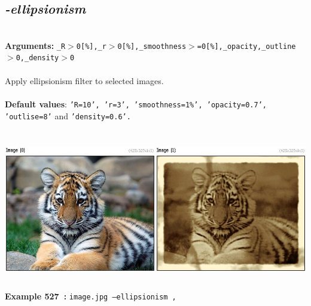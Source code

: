 \documentclass[a4paper,11pt,twoside]{book}
\begin{document}
\subsection{\emph{-ellipsionism} }\vspace*{-0.5em}
~\\\textbf{Arguments: } 
{\small \texttt{\_R$>$0[\%],\_r$>$0[\%],\_smoothness$>$=0[\%],\_opacity,\_outline$>$0,\_density$>$0}}\\~\\
Apply ellipsionism filter to selected images.
~\\~\\\textbf{Default values}: {\small \texttt{'R=10', 'r=3', 'smoothness=1\%', 'opacity=0.7', 'outlise=8'} and \texttt{'density=0.6'.}}
\begin{center}\includegraphics[keepaspectratio=true,height=7cm,width=\textwidth]{img/gmic_def527.jpg}\\
{\footnotesize \textbf{Example 527~:} \texttt{image.jpg --ellipsionism ,}}
\end{center}
\end{document}
